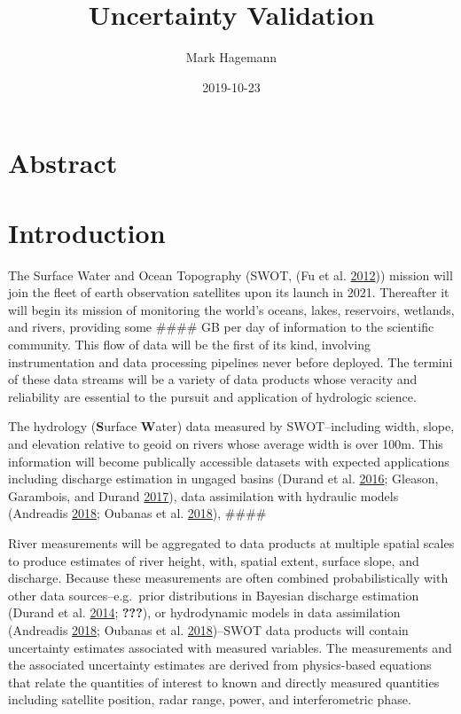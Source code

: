 \documentclass[]{book}
\title{Uncertainty Validation}
\author{Mark Hagemann}
\date{2019-10-23}
\begin{document}
\maketitle

{
\setcounter{tocdepth}{1}
\tableofcontents
}
\hypertarget{abstract}{%
\chapter{Abstract}\label{abstract}}

\hypertarget{introduction}{%
\chapter{Introduction}\label{introduction}}

The Surface Water and Ocean Topography (SWOT, (Fu et al. \protect\hyperlink{ref-fu2012swot}{2012})) mission will join the fleet of earth observation satellites upon its launch in 2021. Thereafter it will begin its mission of monitoring the world's oceans, lakes, reservoirs, wetlands, and rivers, providing some \#\#\#\# GB per day of information to the scientific community. This flow of data will be the first of its kind, involving instrumentation and data processing pipelines never before deployed. The termini of these data streams will be a variety of data products whose veracity and reliability are essential to the pursuit and application of hydrologic science.

The hydrology (\textbf{S}urface \textbf{W}ater) data measured by SWOT--including width, slope, and elevation relative to geoid on rivers whose average width is over 100m. This information will become publically accessible datasets with expected applications including discharge estimation in ungaged basins (Durand et al. \protect\hyperlink{ref-durand2016}{2016}; Gleason, Garambois, and Durand \protect\hyperlink{ref-gleason2017}{2017}), data assimilation with hydraulic models (Andreadis \protect\hyperlink{ref-andreadis2018}{2018}; Oubanas et al. \protect\hyperlink{ref-oubanas2018}{2018}), \#\#\#\#

River measurements will be aggregated to data products at multiple spatial scales to produce estimates of river height, with, spatial extent, surface slope, and discharge. Because these measurements are often combined probabilistically with other data sources--e.g.~prior distributions in Bayesian discharge estimation (Durand et al. \protect\hyperlink{ref-durand2014}{2014}; {\textbf{???}}), or hydrodynamic models in data assimilation (Andreadis \protect\hyperlink{ref-andreadis2018}{2018}; Oubanas et al. \protect\hyperlink{ref-oubanas2018}{2018})--SWOT data products will contain uncertainty estimates associated with measured variables. The measurements and the associated uncertainty estimates are derived from physics-based equations that relate the quantities of interest to known and directly measured quantities including satellite position, radar range, power, and interferometric phase.
\end{document}
